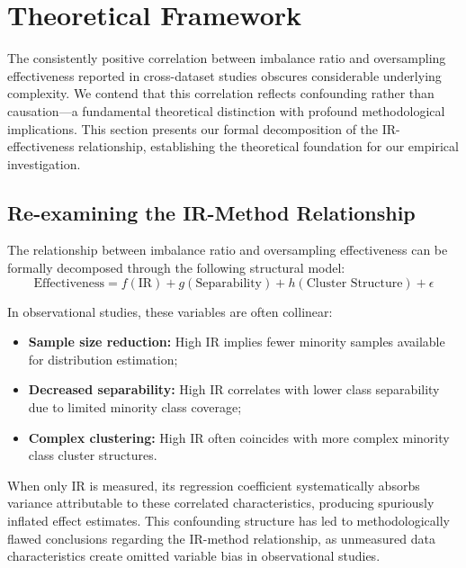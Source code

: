 \documentclass[12pt,a4paper]{article}
\theoremstyle{definition}
\begin{document}
\section{Theoretical Framework}
\indent The consistently positive correlation between imbalance ratio and oversampling effectiveness reported in cross-dataset studies obscures considerable underlying complexity. We contend that this correlation reflects confounding rather than causation---a fundamental theoretical distinction with profound methodological implications. This section presents our formal decomposition of the IR-effectiveness relationship, establishing the theoretical foundation for our empirical investigation.

\subsection{Re-examining the IR-Method Relationship}
The relationship between imbalance ratio and oversampling effectiveness can be formally decomposed through the following structural model:
\begin{equation}
\text{Effectiveness} = f(\text{IR}) + g(\text{Separability}) + h(\text{Cluster Structure}) + \epsilon
\label{eq:decomposition}
\end{equation}

In observational studies, these variables are often collinear:
\begin{itemize}
 \item \textbf{Sample size reduction:} High IR implies fewer minority samples available for distribution estimation;
 \item \textbf{Decreased separability:} High IR correlates with lower class separability due to limited minority class coverage;
 \item \textbf{Complex clustering:} High IR often coincides with more complex minority class cluster structures.
\end{itemize}

When only IR is measured, its regression coefficient systematically absorbs variance attributable to these correlated characteristics, producing spuriously inflated effect estimates. This confounding structure has led to methodologically flawed conclusions regarding the IR-method relationship, as unmeasured data characteristics create omitted variable bias in observational studies.
\end{document}
